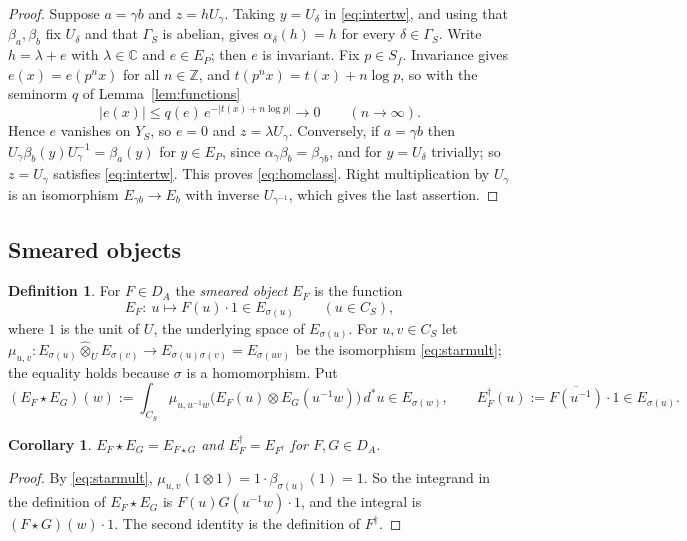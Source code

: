 \documentclass[11pt]{amsart}
\newtheorem{corollary}[theorem]{Corollary}
\theoremstyle{definition}
\newtheorem{definition}[theorem]{Definition}
\theoremstyle{remark}
\newcommand{\C}{\mathbb C}
\newcommand{\Z}{\mathbb Z}
\newcommand{\dstar}{\,d^{*}}
\newcommand{\DA}{D_A}
\begin{document}
\begin{proof}
Suppose $a=\gamma b$ and $z=hU_{\gamma}$.  Taking $y=U_{\delta}$ in
\eqref{eq:intertw}, and using that $\beta_a,\beta_b$ fix $U_{\delta}$ and that
$\Gamma_S$ is abelian, gives $\alpha_{\delta}(h)=h$ for every
$\delta\in\Gamma_S$.  Write $h=\lambda+e$ with $\lambda\in\C$ and $e\in E_P$;
then $e$ is invariant.  Fix $p\in S_f$.  Invariance gives $e(x)=e(p^{n}x)$ for
all $n\in\Z$, and $t(p^{n}x)=t(x)+n\log p$, so with the seminorm $q$ of
Lemma~\ref{lem:functions}
\[
|e(x)|\le q(e)\,e^{-|t(x)+n\log p|}\longrightarrow0\qquad(n\to\infty).
\]
Hence $e$ vanishes on $Y_S$, so $e=0$ and $z=\lambda U_{\gamma}$.  Conversely, if
$a=\gamma b$ then $U_{\gamma}\beta_b(y)U_{\gamma}^{-1}=\beta_a(y)$ for
$y\in E_P$, since $\alpha_{\gamma}\beta_b=\beta_{\gamma b}$, and for
$y=U_{\delta}$ trivially; so $z=U_{\gamma}$ satisfies \eqref{eq:intertw}.
This proves \eqref{eq:homclass}.  Right multiplication by $U_{\gamma}$ is an
isomorphism $E_{\gamma b}\to E_b$ with inverse $U_{\gamma^{-1}}$, which gives
the last assertion.
\end{proof}

\subsection{Smeared objects}

\begin{definition}\label{def:smear}
For $F\in\DA$ the \emph{smeared object} $E_F$ is the function
\begin{equation}\label{eq:smear}
E_F:\ u\longmapsto F(u)\cdot1\in E_{\sigma(u)}\qquad(u\in C_S),
\end{equation}
where $1$ is the unit of $U$, the underlying space of $E_{\sigma(u)}$.  For
$u,v\in C_S$ let
$\mu_{u,v}:E_{\sigma(u)}\widehat\otimes_UE_{\sigma(v)}\to
E_{\sigma(u)\sigma(v)}=E_{\sigma(uv)}$ be the isomorphism \eqref{eq:starmult};
the equality holds because $\sigma$ is a homomorphism.  Put
\[
(E_F\star E_G)(w):=\int_{C_S}\mu_{u,u^{-1}w}\bigl(E_F(u)\otimes E_G(u^{-1}w)\bigr)\dstar u
\in E_{\sigma(w)},\qquad
E_F^{\dagger}(u):=\overline{F(u^{-1})}\cdot1\in E_{\sigma(u)} .
\]
\end{definition}

\begin{corollary}\label{cor:trivial}
$E_F\star E_G=E_{F\star G}$ and $E_F^{\dagger}=E_{F^{\dagger}}$ for
$F,G\in\DA$.
\end{corollary}

\begin{proof}
By \eqref{eq:starmult}, $\mu_{u,v}(1\otimes1)=1\cdot\beta_{\sigma(u)}(1)=1$.
So the integrand in the definition of $E_F\star E_G$ is
$F(u)G(u^{-1}w)\cdot1$, and the integral is $(F\star G)(w)\cdot1$.  The
second identity is the definition of $F^{\dagger}$.
\end{proof}
\end{document}
